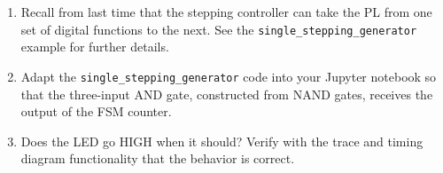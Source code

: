 \documentclass{article}
\begin{document}
\begin{enumerate}
\item Recall from last time that the stepping controller can take the PL from one set of digital functions to the next.  See the \verb+single_stepping_generator+ example for further details.
\item Adapt the \verb+single_stepping_generator+ code into your Jupyter notebook so that the three-input AND gate, constructed from NAND gates, receives the output of the FSM counter.
\item Does the LED go HIGH when it should?  Verify with the trace and timing diagram functionality that the behavior is correct.
\end{enumerate}
\end{document}

